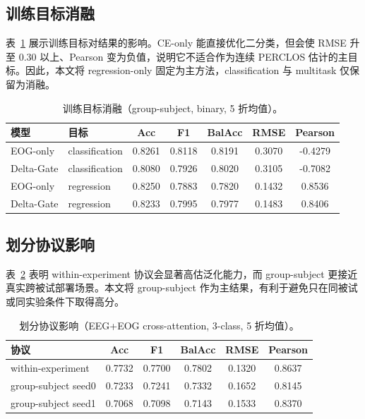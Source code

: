 \documentclass[UTF8,a4paper,11pt,fontset=windows]{ctexart}
\begin{document}
\subsection{训练目标消融}
表~\ref{tab:objective} 展示训练目标对结果的影响。CE-only 能直接优化二分类，但会使 RMSE 升至 0.30 以上、Pearson 变为负值，说明它不适合作为连续 PERCLOS 估计的主目标。因此，本文将 regression-only 固定为主方法，classification 与 multitask 仅保留为消融。

\begin{table}[H]
\centering
\caption{训练目标消融（group-subject, binary, 5 折均值）。}
\label{tab:objective}
\small
\begin{tabular}{llccccc}
\toprule
模型 & 目标 & Acc & F1 & BalAcc & RMSE & Pearson \\
\midrule
EOG-only & classification & 0.8261 & 0.8118 & 0.8191 & 0.3070 & -0.4279 \\
Delta-Gate & classification & 0.8080 & 0.7926 & 0.8020 & 0.3105 & -0.7082 \\
EOG-only & regression & 0.8250 & 0.7883 & 0.7820 & 0.1432 & 0.8536 \\
Delta-Gate & regression & 0.8233 & 0.7995 & 0.7977 & 0.1483 & 0.8406 \\
\bottomrule
\end{tabular}
\end{table}

\subsection{划分协议影响}
表~\ref{tab:split} 表明 within-experiment 协议会显著高估泛化能力，而 group-subject 更接近真实跨被试部署场景。本文将 group-subject 作为主结果，有利于避免只在同被试或同实验条件下取得高分。

\begin{table}[H]
\centering
\caption{划分协议影响（EEG+EOG cross-attention, 3-class, 5 折均值）。}
\label{tab:split}
\small
\begin{tabular}{lccccc}
\toprule
协议 & Acc & F1 & BalAcc & RMSE & Pearson \\
\midrule
within-experiment & 0.7732 & 0.7700 & 0.7802 & 0.1320 & 0.8637 \\
group-subject seed0 & 0.7233 & 0.7241 & 0.7332 & 0.1652 & 0.8145 \\
group-subject seed1 & 0.7068 & 0.7098 & 0.7143 & 0.1533 & 0.8370 \\
\bottomrule
\end{tabular}
\end{table}
\end{document}
